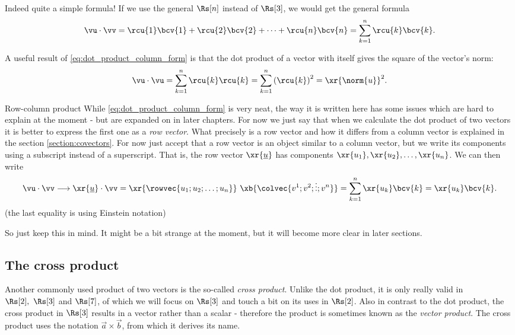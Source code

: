 Indeed quite a simple formula! If we use the general $\Rs[n]$ instead of $\Rs[3]$, we would get the general formula
\begin{equation}
  \vu\cdot\vv = \rcu{1}\bcv{1} + \rcu{2}\bcv{2} + \cdots + \rcu{n}\bcv{n} = \sum\limits_{k=1}^{n}\rcu{k}\bcv{k}.
  \label{eq:dot_product_column_form}
\end{equation}


A useful result of \autoref{eq:dot_product_column_form} is that the dot product of a vector with itself gives the square of the vector's norm:
\begin{equation}
  \vu\cdot\vu = \sum\limits_{k=1}^{n}\rcu{k}\rcu{k} = \sum\limits_{k=1}^{n}\left(\rcu{k}\right)^{2} = \xr{\norm{u}}^{2}.
  \label{eq:dot_product_sqr_norm}
\end{equation}

\begin{note}{Row-column product}{}
  While \autoref{eq:dot_product_column_form} is very neat, the way it is written here has some issues which are hard to explain at the moment - but are expanded on in later chapters. For now we just say that when we calculate the dot product of two vectors it is better to express the first one as a \emph{row vector}. What precisely is a row vector and how it differs from a column vector is explained in the section \autoref{section:covectors}. For now just accept that a row vector is an object similar to a column vector, but we write its components using a subscript instead of a superscript. That is, the row vector $\xr{\underline{u}}$ has components $\xr{u_{1}}, \xr{u_{2}}, \dots, \xr{u_{n}}$. We can then write
  \[
    \vu\cdot\vv \longrightarrow \xr{\underline{u}}\cdot\vv = \xr{\rowvec{u_{1};u_{2};\dots;u_{n}}}\ \xb{\colvec{v^{1};v^{2};\vdots;v^{n}}} = \sum\limits_{k=1}^{n}\xr{u_{k}}\bcv{k} = \xr{u_{k}}\bcv{k}.
  \]
  (the last equality is using Einstein notation)

  \vspace{1em}
  So just keep this in mind. It might be a bit strange at the moment, but it will become more clear in later sections.
\end{note}

\subsection{The cross product}
Another commonly used product of two vectors is the so-called \emph{cross product}. Unlike the dot product, it is only really valid in $\Rs[2],\ \Rs[3]$ and $\Rs[7]$, of which we will focus on $\Rs[3]$ and touch a bit on its uses in $\Rs[2]$. Also in contrast to the dot product, the cross product in $\Rs[3]$ results in a vector rather than a scalar - therefore the product is sometimes known as the \emph{vector product}. The cross product uses the notation $\vec{a}\times\vec{b}$, from which it derives its name.


